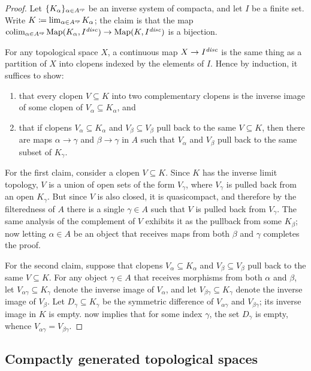 \begin{proof}
	Let $ \{ K_{\alpha} \}_{\alpha \in A^{\textit{op}}} $ be an inverse system of compacta, and let $ I $ be a finite set.
	Write $ K \coloneq \lim_{\alpha \in A^{\textit{op}}} K_{\alpha} $;
	the claim is that the map $ \operatorname*{colim}_{\alpha \in A^{\textit{op}}} \operatorname{Map}(K_{\alpha}, I^{\textit{disc}}) \to \operatorname{Map}(K, I^{\textit{disc}}) $ is a bijection.

	For any topological space $ X $, a continuous map $ X \to I^{\textit{disc}} $ is the same thing as a partition of $ X $ into clopens indexed by the elements of $ I $.
	Hence by induction, it suffices to show:
	\begin{enumerate}[(1)]
		\item that every clopen $ V \subseteq K $ into two complementary clopens is the inverse image of some clopen of $ V_{\alpha} \subseteq K_{\alpha} $, and
		\item that if clopens $ V_{\alpha} \subseteq K_{\alpha} $ and $ V_{\beta} \subseteq V_{\beta} $ pull back to the same $ V \subseteq K $, then there are maps $ \alpha \to \gamma $ and $ \beta \to \gamma $ in $ A $ such that $ V_{\alpha} $ and $ V_{\beta} $ pull back to the same subset of $ K_{\gamma} $.
	\end{enumerate}

	For the first claim, consider a clopen $ V \subseteq K $.
	Since $ K $ has the inverse limit topology, $ V $ is a union of open sets of the form $ V_{\gamma} $, where $ V_{\gamma} $ is pulled back from an open $ K_{\gamma} $.
	But since $ V $ is also closed, it is quasicompact, and therefore by the filteredness of $ A $ there is a single $ \gamma \in A $ such that $ V $ is pulled back from $ V_{\gamma} $.
	The same analysis of the complement of $ V $ exhibits it as the pullback from some $ K_{\beta} $;
	now letting $ \alpha \in A $ be an object that receives maps from both $ \beta $ and $ \gamma $ completes the proof.

	For the second claim, suppose that clopens $ V_{\alpha} \subseteq K_{\alpha} $ and $ V_{\beta} \subseteq V_{\beta} $ pull back to the same $ V \subseteq K $.
	For any object $ \gamma \in A $ that receives morphisms from both $ \alpha $ and $ \beta $, let $ V_{\alpha\gamma} \subseteq K_{\gamma} $ denote the inverse image of $ V_{\alpha} $, and let $ V_{\beta\gamma} \subseteq K_{\gamma} $ denote the inverse image of $ V_{\beta} $.
	Let $D_{\gamma} \subseteq K_{\gamma} $ be the symmetric difference of $ V_{\alpha\gamma} $ and $ V_{\beta\gamma} $;
	its inverse image in $ K $ is empty.
	 now implies that for some index $\gamma$, the set $ D_{\gamma} $ is empty, whence $ V_{\alpha\gamma} = V_{\beta\gamma}$.
\end{proof}

\subsection{Compactly generated topological spaces}

